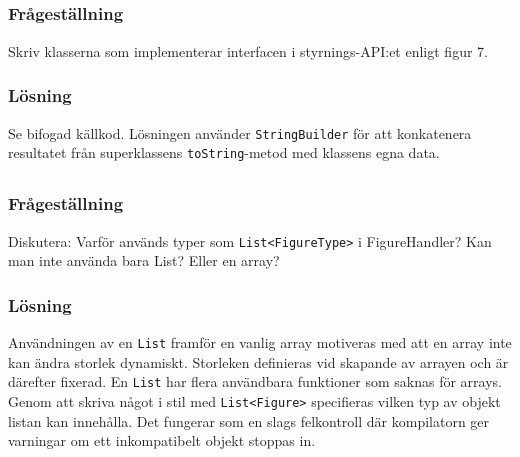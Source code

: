 \subsection{}\label{sec:uppg3b}
\subsubsection*{Frågeställning}
Skriv klasserna som implementerar interfacen i styrnings-API:et enligt figur 7.

\subsubsection*{Lösning}
Se bifogad källkod. Lösningen använder \texttt{StringBuilder} för att
konkatenera resultatet från superklassens \texttt{toString}-metod med klassens
egna data.


\subsection{}\label{sec:uppg3c}
\subsubsection*{Frågeställning}
Diskutera: Varför används typer som \texttt{List<FigureType>} i FigureHandler?
Kan man inte använda bara List? Eller en array?


\subsubsection*{Lösning}
Användningen av en \texttt{List} framför en vanlig array motiveras med att en
array inte kan ändra storlek dynamiskt. Storleken definieras vid skapande av
arrayen och är därefter fixerad. En \texttt{List} har flera användbara
funktioner som saknas för arrays. Genom att skriva något i stil med
\texttt{List<Figure>} specifieras vilken typ av objekt listan kan innehålla.
Det fungerar som en slags felkontroll där kompilatorn ger varningar om ett
inkompatibelt objekt stoppas in.


